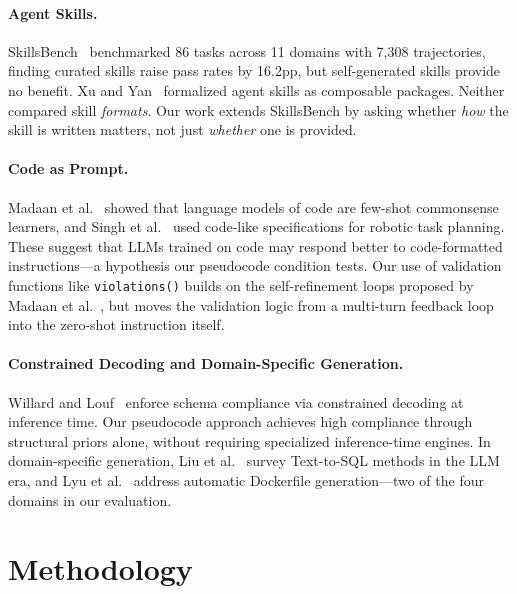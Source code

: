 \documentclass[sigconf,nonacm]{acmart}
\begin{document}
\paragraph{Agent Skills.}
SkillsBench~\cite{li2026skillsbench} benchmarked 86 tasks across 11 domains
with 7,308 trajectories, finding curated skills raise pass rates by 16.2pp,
but self-generated skills provide no benefit. Xu and
Yan~\cite{xu2026agentskills} formalized agent skills as composable packages.
Neither compared skill \emph{formats}. Our work extends SkillsBench by asking
whether \emph{how} the skill is written matters, not just \emph{whether} one
is provided.

\paragraph{Code as Prompt.}
Madaan et al.~\cite{madaan2022language} showed that language models of code
are few-shot commonsense learners, and Singh et
al.~\cite{singh2023progprompt} used code-like specifications for robotic task
planning. These suggest that LLMs trained on code may respond better to
code-formatted instructions---a hypothesis our pseudocode condition tests.
Our use of validation functions like \texttt{violations()} builds on the
self-refinement loops proposed by Madaan et
al.~\cite{madaan2023selfrefine}, but moves the validation logic from a
multi-turn feedback loop into the zero-shot instruction itself.

\paragraph{Constrained Decoding and Domain-Specific Generation.}
Willard and Louf~\cite{willard2023efficient} enforce schema compliance via
constrained decoding at inference time. Our pseudocode approach achieves high
compliance through structural priors alone, without requiring specialized
inference-time engines. In domain-specific generation, Liu et
al.~\cite{liu2024survey} survey Text-to-SQL methods in the LLM era, and Lyu
et al.~\cite{lyu2026automatic} address automatic Dockerfile generation---two
of the four domains in our evaluation.



\section{Methodology}\label{sec:method}
\end{document}
